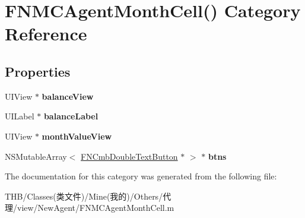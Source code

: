 \hypertarget{category_f_n_m_c_agent_month_cell_07_08}{}\section{F\+N\+M\+C\+Agent\+Month\+Cell() Category Reference}
\label{category_f_n_m_c_agent_month_cell_07_08}
\subsection*{Properties}
\begin{DoxyCompactItemize}
\item 
\mbox{\label{category_f_n_m_c_agent_month_cell_07_08_a103c984db0eb33571329521c14918261}} 
U\+I\+View $\ast$ {\bfseries balance\+View}
\item 
\mbox{\label{category_f_n_m_c_agent_month_cell_07_08_ad2f4a95663ca7640af6cf32f86e92cad}} 
U\+I\+Label $\ast$ {\bfseries balance\+Label}
\item 
\mbox{\label{category_f_n_m_c_agent_month_cell_07_08_a45175d1ef8d0fd4784e4b2b0f6b8b27c}} 
U\+I\+View $\ast$ {\bfseries month\+Value\+View}
\item 
\mbox{\label{category_f_n_m_c_agent_month_cell_07_08_a9a5d99c162fbbfe9f1104ecb789098ea}} 
N\+S\+Mutable\+Array$<$ \mbox{\hyperlink{interface_f_n_cmb_double_text_button}{F\+N\+Cmb\+Double\+Text\+Button}} $\ast$ $>$ $\ast$ {\bfseries btns}
\end{DoxyCompactItemize}


The documentation for this category was generated from the following file\+:\begin{DoxyCompactItemize}
\item 
T\+H\+B/\+Classes(类文件)/\+Mine(我的)/\+Others/代理/view/\+New\+Agent/F\+N\+M\+C\+Agent\+Month\+Cell.\+m\end{DoxyCompactItemize}
